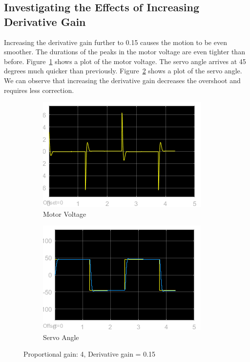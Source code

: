 \documentclass[12pt]{article}
\begin{document}
\subsection*{Investigating the Effects of Increasing Derivative Gain} %
Increasing the derivative gain further to 0.15 causes the motion to be even smoother. The durations of the peaks in the motor voltage are even tighter than before. Figure~\ref{fig:xii_volt} shows a plot of the motor voltage. The servo angle arrives at 45 degrees much quicker than previously. Figure~\ref{fig:xii_angle} shows a plot of the servo angle. We can observe that increasing the derivative gain decreases the overshoot and requires less correction.
\begin{figure}[h!]
    \centering
    \begin{subfigure}[b]{0.46\textwidth}
        \includegraphics[width=\textwidth]{xii_voltage}
        \caption{\label{fig:xii_volt}Motor Voltage}     
    \end{subfigure}
    \begin{subfigure}[b]{0.46\textwidth}
        \includegraphics[width=\textwidth]{xii_angle}
        \caption{\label{fig:xii_angle}Servo Angle} 
    \end{subfigure}
    \caption{\label{fig:xii} Proportional gain: 4, Derivative gain = 0.15}
\end{figure}
\end{document}
